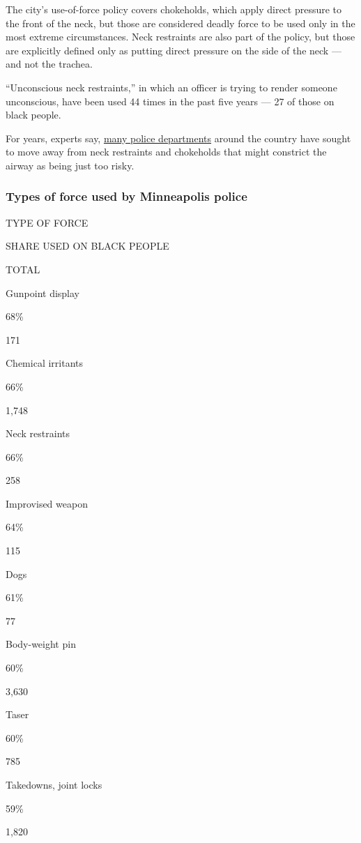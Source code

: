 The city's use-of-force policy covers chokeholds, which apply direct
pressure to the front of the neck, but those are considered deadly force
to be used only in the most extreme circumstances. Neck restraints are
also part of the policy, but those are explicitly defined only as
putting direct pressure on the side of the neck --- and not the trachea.

``Unconscious neck restraints,'' in which an officer is trying to render
someone unconscious, have been used 44 times in the past five years ---
27 of those on black people.

For years, experts say,
\href{https://www.nytimes3xbfgragh.onion/2020/05/29/us/knee-neck-george-floyd-death.html}{many
police departments} around the country have sought to move away from
neck restraints and chokeholds that might constrict the airway as being
just too risky.

\hypertarget{types-of-force-used-by-minneapolis-police}{%
\subsubsection{Types of force used by Minneapolis
police}\label{types-of-force-used-by-minneapolis-police}}

TYPE OF FORCE

SHARE USED ON BLACK PEOPLE

TOTAL

Gunpoint display

68\%

171

Chemical irritants

66\%

1,748

Neck restraints

66\%

258

Improvised weapon

64\%

115

Dogs

61\%

77

Body-weight pin

60\%

3,630

Taser

60\%

785

Takedowns, joint locks

59\%

1,820

